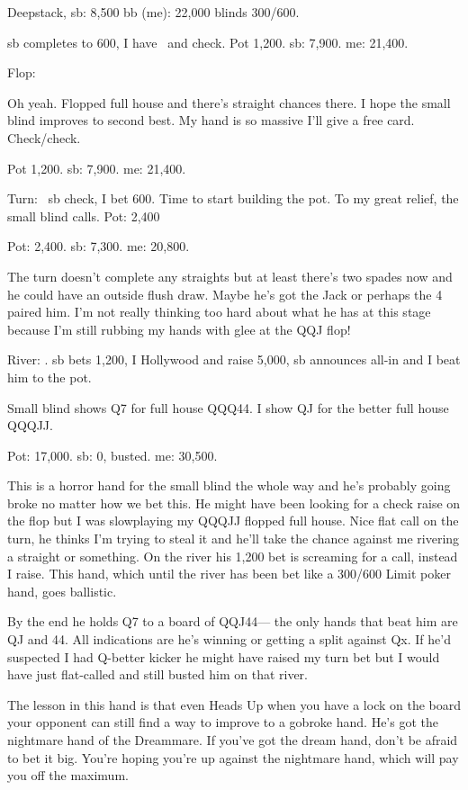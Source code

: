 Deepstack, sb: 8,500 bb (me): 22,000 blinds 300/600.

sb completes to 600, I have \Qc\Jh\ and check.
Pot 1,200. sb: 7,900. me: 21,400.

Flop: \Qs\Qh\Jd

Oh yeah. Flopped full house and there's straight chances there. I hope
the small blind improves to second best. My hand is so massive I'll give
a free card. Check/check.

Pot 1,200. sb: 7,900. me: 21,400.

Turn: \fours\ sb check, I bet 600. Time to start building the pot. To
my great relief, the small blind calls. Pot: 2,400

Pot: 2,400. sb: 7,300. me: 20,800.

The turn doesn't complete any straights but at least there's
two spades now and he could have an outside flush draw. Maybe he's
got the Jack or perhaps the 4 paired him. I'm not really thinking
too hard about what he has at this stage because I'm still rubbing my
hands with glee at the QQJ flop!

River: \fourc. sb bets 1,200, I Hollywood and raise 5,000, sb announces all-in
and I beat him to the pot.

Small blind shows Q7 for full house QQQ44. I show QJ for the better
full house QQQJJ.

Pot: 17,000. sb: 0, busted. me: 30,500.

This is a horror hand for the small blind the whole way and he's probably
going broke no matter how we bet this. He might have been looking for
a check raise on the flop but I was slowplaying my QQQJJ flopped full house.
Nice flat call on the turn, he thinks I'm trying to steal it and he'll take
the chance against me rivering a straight or something. On the river his
1,200 bet is screaming for a call, instead I raise. This hand, which until
the river has been bet like a 300/600 Limit poker hand, goes ballistic.

By the end he holds Q7 to a board of QQJ44--- the only hands that beat
him are QJ and 44. All indications are he's winning or getting a split
against Qx. If he'd suspected I had Q-better kicker he might have
raised my turn bet but I would have just flat-called and still busted
him on that river.

The lesson in this hand is that even Heads Up when you have a lock on
the board your opponent can still find a way to improve to a gobroke
hand. He's got the nightmare hand of the Dreammare.
If you've got the dream hand, don't be afraid to bet it big. You're
hoping you're up against the nightmare hand, which will pay you off
the maximum.

